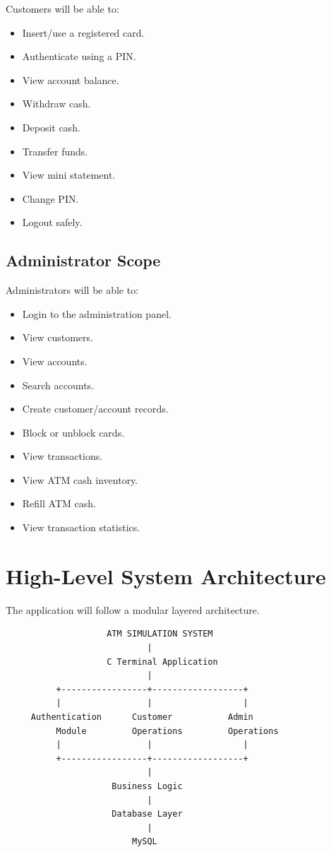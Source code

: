 \documentclass[12pt,a4paper]{article}
\begin{document}
Customers will be able to:

\begin{itemize}
    \item Insert/use a registered card.
    \item Authenticate using a PIN.
    \item View account balance.
    \item Withdraw cash.
    \item Deposit cash.
    \item Transfer funds.
    \item View mini statement.
    \item Change PIN.
    \item Logout safely.
\end{itemize}

\subsection{Administrator Scope}

Administrators will be able to:

\begin{itemize}
    \item Login to the administration panel.
    \item View customers.
    \item View accounts.
    \item Search accounts.
    \item Create customer/account records.
    \item Block or unblock cards.
    \item View transactions.
    \item View ATM cash inventory.
    \item Refill ATM cash.
    \item View transaction statistics.
\end{itemize}


\section{High-Level System Architecture}

The application will follow a modular layered architecture.

\begin{verbatim}
                    ATM SIMULATION SYSTEM
                            |
                    C Terminal Application
                            |
          +-----------------+------------------+
          |                 |                  |
     Authentication      Customer           Admin
          Module         Operations         Operations
          |                 |                  |
          +-----------------+------------------+
                            |
                     Business Logic
                            |
                     Database Layer
                            |
                         MySQL
\end{verbatim}
\end{document}
